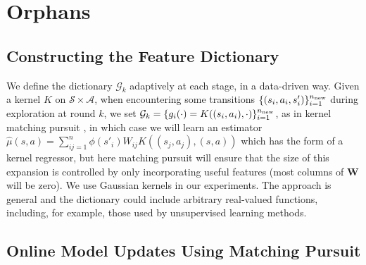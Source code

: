 \documentclass[letterpaper]{article}
\newcommand{\BengioKernelMP}{DBLP:journals/ml/VincentB02}
\newcommand{\cA}{{\mathcal A}}
\newcommand{\cS}{{\mathcal S}}
\newcommand{\cG}{{\mathcal G}}
\newcommand{\bW}{{\bm W}}
\begin{document}
\section{Orphans}

\subsection{Constructing the Feature Dictionary}

We define the dictionary $\cG_k$ adaptively at each stage, in a data-driven way. Given a kernel $K$ on $\cS\times\cA$, when encountering some transitions $\{(s_i,a_i,s'_i)\}_{i=1}^{n_{\rm new}}$ during exploration at round $k$, we set $\cG_k = \{g_i(\cdot) = K((s_i,a_i),\cdot)\}_{i=1}^{n_{\rm new}}$, as in kernel matching pursuit \citep{\BengioKernelMP}, in which case we will learn an estimator $\hat\mu(s,a) = \sum_{ij=1}^{n} \phi(s'_i) W_{ij} K((s_j,a_j),(s,a))$ which has the form of a kernel regressor, but here matching pursuit will ensure that the size of this expansion is controlled by only incorporating useful features (most columns of $\bW$ will be zero). We use Gaussian kernels in our experiments. The approach is general and the dictionary could include arbitrary real-valued functions, including, for example, those used by unsupervised learning methods.



\subsection{Online Model Updates Using  Matching Pursuit} \label{OnlineModelUpdate}
\end{document}

